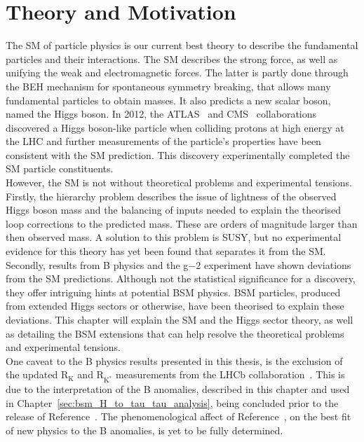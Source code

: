 \chapter{Theory and Motivation}
\label{sec:theory}

The \ac{SM} of particle physics is our current best theory to describe the fundamental particles and their interactions.
The \ac{SM} describes the strong force, as well as unifying the weak and electromagnetic forces.
The latter is partly done through the \ac{BEH} mechanism for spontaneous symmetry breaking, that allows many fundamental particles to obtain masses.
It also predicts a new scalar boson, named the Higgs boson.
In 2012, the ATLAS~\cite{ATLAS_Higgs_Discovery} and CMS~\cite{CMS_Higgs_Discovery} collaborations discovered a Higgs boson-like particle when colliding protons at high energy at the \ac{LHC} and further measurements of the particle's properties have been consistent with the \ac{SM} prediction.
This discovery experimentally completed the \ac{SM} particle constituents. \\

However, the \ac{SM} is not without theoretical problems and experimental tensions.
Firstly, the hierarchy problem describes the issue of lightness of the observed Higgs boson mass and the  balancing of inputs needed to explain the theorised loop corrections to the predicted mass. 
These are orders of magnitude larger than then observed mass.
A solution to this problem is \ac{SUSY}, but no experimental evidence for this theory has yet been found that separates it from the \ac{SM}. 
Secondly, results from B physics \cite{LHCb:2021trn,Kowalewski:2013mna,BaBar:2013mob,Belle:2015qfa,LHCb:2015gmp,Belle:2016dyj,LHCb:2017rln,LHCb:2017smo} and the g−2 experiment \cite{Muong-2:2021ojo} have shown deviations from the \ac{SM} predictions.
Although not the statistical significance for a discovery, they offer intriguing hints at potential \ac{BSM} physics.
\ac{BSM} particles, produced from extended Higgs sectors or otherwise, have been theorised to explain these deviations.
This chapter will explain the \ac{SM} and the Higgs sector theory, as well as detailing the \ac{BSM} extensions that can help resolve the theoretical problems and experimental tensions. \\

One caveat to the B physics results presented in this thesis, is the exclusion of the updated $\text{R}_{\text{K}}$ and $\text{R}_{\text{K}^{*}}$ measurements from the LHCb collaboration~\cite{LHCb:2022zom}.
This is due to the interpretation of the B anomalies, described in this chapter and used in Chapter~\ref{sec:bsm_H_to_tau_tau_analysis}, being concluded prior to the release of Reference~\cite{LHCb:2022zom}.
The phenomenological affect of Reference~\cite{LHCb:2022zom}, on the best fit of new physics to the B anomalies, is yet to be fully determined.

